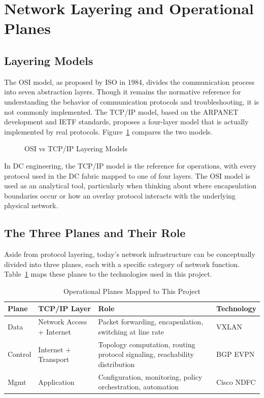 \section{Network Layering and Operational Planes}
\subsection*{Layering Models}
The OSI model, as proposed by ISO in 1984, divides the communication process into seven abstraction layers\cite{ISO_IEC_7498_1_1994}. Though it remains the normative reference for understanding the behavior of communication protocols and troubleshooting, it is not commonly implemented. The TCP/IP model, based on the ARPANET development and IETF standards, proposes a four-layer model that is actually implemented by real protocols\cite{IETFRFC1122}. Figure~\ref{fig:osi-vs-tcpip} compares the two models.

\begin{figure}[!htbp]
    \centering
    \TCPvsOSI
    \caption{OSI vs TCP/IP Layering Models}
    \label{fig:osi-vs-tcpip}
\end{figure}

In DC engineering, the TCP/IP model is the reference for operations, with every protocol used in the DC fabric mapped to one of four layers\cite{Data_Center_TCP/IP_Networking_Guide}. The OSI model is used as an analytical tool, particularly when thinking about where encapsulation boundaries occur or how an overlay protocol interacts with the underlying physical network.

\subsection*{The Three Planes and Their Role}
Aside from protocol layering, today’s network infrastructure can be conceptually divided into three planes, each with a specific category of network function\cite{SDN_Architecture}. Table~\ref{tab:operational-planes} maps these planes to the technologies used in this project.

\begin{table}[!htbp]
    \centering
    \small
    \renewcommand{\arraystretch}{1.5}
    \begin{tabularx}{\textwidth}{|l|p{3cm}|X|p{2.5cm}|}
        \hline
        \textbf{Plane} & \textbf{TCP/IP Layer} & \textbf{Role} & \textbf{Technology} \\ \hline
        Data & Network Access + Internet & Packet forwarding, encapsulation, switching at line rate & VXLAN \\ \hline
        Control & Internet + Transport & Topology computation, routing protocol signaling, reachability distribution & BGP EVPN \\ \hline
        Mgmt & Application & Configuration, monitoring, policy orchestration, automation & Cisco NDFC \\ \hline
    \end{tabularx}
    \caption{Operational Planes Mapped to This Project}
    \label{tab:operational-planes}
\end{table}

